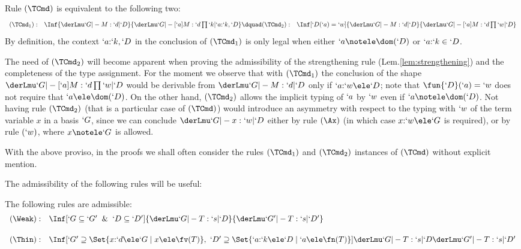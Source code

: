 \documentclass{CSML}
\begin{document}
 \begin{rem} \label{rem:TCmd-rule}
Rule $(\TCmd)$ is equivalent to the following two:
%
 \[ \begin{array}[t]{rl@{\dquad}rl}
(\TCmd_1 ) : &
\Inf	{\derLmu `G |- M : `d | `D }
	{\derLmu `G |- [`a]M : `d\prod `k | `a{:}`k,`D } &
(\TCmd_2) : &
\Inf	[`D(`a) = `w]
	{\derLmu `G |- M : `d | `D }
	{\derLmu `G |- [`a]M : `d\prod `w | `D }
 \end{array} \]
By definition, the context $`a{:}`k,`D $ in the conclusion of $(\TCmd_1)$ is only legal when either $`a\notele \dom(`D)$ or $`a{:}`k\in`D $.

The need of $(\TCmd_2)$ will become apparent when proving the admissibility of the strengthening rule (Lem.\skp\ref{lem:strengthening}) and the completeness of the type assignment. 
For the moment we observe that with $(\TCmd_1 )$ the conclusion of the shape $ \derLmu `G |- {[`a]}M : {`d\prod `w} | `D $ would be derivable from $ \derLmu `G |- M : `d | `D $ only if
$`a{:}`w\ele `D $; note that $\fun{`D }(`a)=`w$ does not require that $`a\ele \dom(`D)$. 
On the other hand, $(\TCmd_2)$ allows the implicit typing of $`a$ by $`w$ even if $`a\notele \dom(`D)$.
Not having rule $(\TCmd_2)$ (that is a particular case of $(\TCmd)$) would introduce an asymmetry with respect to the typing with $`w$ of the term variable $x$ in a basis $`G$, since we can conclude $ \derLmu `G |- x : `w | `D $ either by rule $(\Ax)$ (in which case $x{:}`w \ele `G$ is required), or by rule $(`w)$, where $x\notele `G$ is allowed.

With the above proviso, in the proofs we shall often consider the rules $(\TCmd_1 )$ and $(\TCmd_2 )$ instances of $(\TCmd)$ without explicit mention.
 \end{rem} 


The admissibility of the following rules will be useful:

 \begin{lem} \label{lem:weakening}
The following rules are admissible:
%
 \[ \begin{array}{rl}
(\Weak): &
\Inf	[ `G \subseteq `G' \And `D \subseteq `D' ]
	{ \derLmu `G |- T : `s | `D 
	}{ \derLmu `G' |- T : `s | `D' }
 \\ [5mm]
(\Thin): &
\Inf	[`G' \supseteq \Set {x{:}`d\ele`G \mid x \ele \fv(T) }, ~ `D' \supseteq \Set {`a{:}`k\ele`D \mid `a \ele \fn(T) }]
	{\derLmu `G |- T : `s | `D
	}{\derLmu `G' |- T : `s | `D' }
 \end{array} \] 
 \end{lem}
\end{document}
